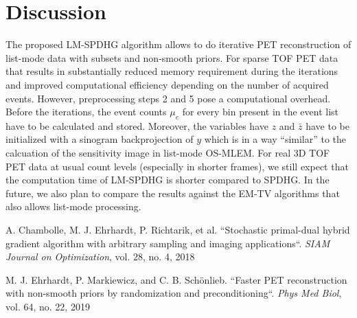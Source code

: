\documentclass{IEEEtran}
\begin{document}

\section{Discussion}

The proposed LM-SPDHG algorithm allows to do iterative PET reconstruction of list-mode
data with subsets and non-smooth priors.
For sparse TOF PET data that results in substantially reduced memory requirement during
the iterations and improved computational efficiency depending on the number of acquired
events.
However, preprocessing steps 2 and 5 pose a computational overhead. 
Before the iterations, the event counts $\mu_e$ for every bin present in the event list
have to be calculated and stored.
Moreover, the variables have $z$ and $\bar{z}$ have to be initialized with a sinogram
backprojection of $y$ which is in a way ``similar'' to the calcuation of the sensitivity
image in list-mode OS-MLEM.
For real 3D TOF PET data at usual count levels (especially in shorter frames), we still
expect that the computation time of LM-SPDHG is shorter compared to SPDHG.
In the future, we also plan to compare the results against the EM-TV algorithms that also
allows list-mode processing.


\begin{thebibliography}{00}
A. Chambolle, M. J. Ehrhardt, P. Richtarik, et al. 
``Stochastic primal-dual hybrid gradient algorithm with arbitrary sampling and imaging
applications``. 
\textit{SIAM Journal on Optimization}, vol. 28, no. 4, 2018

 M. J. Ehrhardt, P. Markiewicz, and C. B. Sch\"onlieb. 
``Faster PET reconstruction with non-smooth priors by randomization and preconditioning``. 
\textit{Phys Med Biol}, vol. 64, no. 22, 2019
\end{thebibliography}
\end{document}
